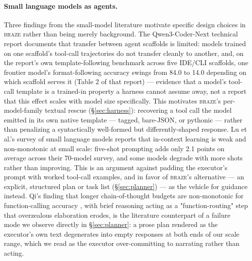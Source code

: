 \documentclass[smallcondensed,natbib]{svjour3}
\newcommand{\braze}{\textsc{braze}}
\begin{document}
\paragraph{Small language models as agents.} Three findings from the
small-model literature motivate specific design choices in \braze{}
rather than being merely background. The Qwen3-Coder-Next technical
report \citep{qwen3coder} documents that transfer between agent
scaffolds is limited: models trained on one scaffold's tool-call
trajectories do not transfer cleanly to another, and, on the report's
own template-following benchmark across five IDE/CLI scaffolds, one
frontier model's format-following accuracy swings from 84.0 to 14.0
depending on which scaffold serves it (Table 2 of that report) ---
evidence that a model's tool-call template is a trained-in property a
harness cannot assume away, not a report that this effect scales with
model size specifically. This motivates \braze{}'s per-model-family
textual rescue (\S\ref{sec:harness}): recovering a tool call the model
emitted in its own native template --- tagged, bare-JSON, or pythonic
--- rather than penalizing a syntactically well-formed but
differently-shaped response. Lu et al.'s survey of small language
models
\citep{lu2024smalllm} reports that in-context learning is weak and
non-monotonic at small scale: five-shot prompting adds only 2.1 points
on average across their 70-model survey, and some models degrade with
more shots rather than improving. This is an argument against padding
the executor's prompt with worked tool-call examples, and in favor of
\braze{}'s alternative --- an explicit, structured plan or task list
(\S\ref{sec:planner}) --- as the vehicle for guidance instead. Qi's
finding that longer chain-of-thought budgets are non-monotonic for
function-calling accuracy \citep{qi2026briefbetter}, with brief
reasoning acting as a "function-routing" step that overzealous
elaboration erodes, is the literature counterpart of a failure mode we
observe directly in \S\ref{sec:planner}: a prose plan rendered as the
executor's own text degenerates into empty responses at both ends of
our scale range, which we read as the executor over-committing to
narrating rather than acting.
\end{document}
